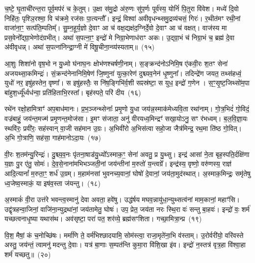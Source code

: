 च॒ष्टे॒ घृ॒ताची॑रन्त॒रा पूर्व॒मप॑रं च के॒तुम्। उ॒क्षा स॑मु॒द्रो अ॑रु॒णः सु॑प॒र्णः पूर्व॑स्य॒ योनिं॑ पि॒तुरा वि॑वेश। मध्ये॑ दि॒वो निहि॑तः॒ पृश्ञि॒रश्मा॒ वि च॑क्रमे॒ रज॑सः पा॒त्यन्तौ᳚। इन्द्रं॒ विश्वा॑ अवीवृधन्थ्समु॒द्रव्य॑चसं॒ गिरः॑। र॒थीत॑मꣳ रथी॒नां वाजा॑ना॒ꣳ॒ सत्प॑ति॒म्पतिम्᳚। सु॒म्न॒हूर्य॒ज्ञो दे॒वाꣳ आ च॑ वक्ष॒द्यक्ष॑द॒ग्निर्दे॒वो दे॒वाꣳ आ च॑ वक्षत्। वाज॑स्य मा प्रस॒वेनो᳚द्ग्रा॒भेणोद॑ग्रभीत्। अथा॑ स॒पत्ना॒ꣳ॒ इन्द्रो॑ मे निग्रा॒भेणाध॑राꣳ अकः। उ॒द्ग्रा॒भं च॑ निग्रा॒भं च॒ ब्रह्म॑ दे॒वा अ॑वीवृधन्न्। अथा॑ स॒पत्ना॑निन्द्रा॒ग्नी मे॑ विषू॒चीना॒न्व्य॑स्यताम्॥~(१५)

{\anuvakamend[{दे॒वाः श॒तप॑या अ॒भि वाज॑स्य॒ षड्विꣳ॑शतिश्च}]}%

आ॒शुः शिशा॑नो वृष॒भो न यु॒ध्मो घ॑नाघ॒नः क्षोभ॑णश्चर्\mbox{}षणी॒नाम्। स॒ङ्क्रन्द॑नो\-ऽनिमि॒ष ए॑कवी॒रः श॒तꣳ सेना॑ अजयथ्सा॒कमिन्द्रः॑। सं॒क्रन्द॑नेनानिमि॒षेण॑ जि॒ष्णुना॑ युत्का॒रेण॑ दुश्च्यव॒नेन॑ धृ॒ष्णुना᳚। तदिन्द्रे॑ण जयत॒ तथ्स॑हध्वं॒ युधो॑ नर॒ इषु॑हस्तेन॒ वृष्णा᳚। स इषु॑हस्तैः॒ स नि॑ष॒ङ्गिभि॑र्व॒शी सꣴस्र॑ष्टा॒ स युध॒ इन्द्रो॑ ग॒णेन। स॒ꣳ॒सृ॒ष्ट॒जिथ्सो॑म॒पा बा॑हुश॒र्ध्यू᳚र्ध्वध॑न्वा॒ प्रति॑हिताभि॒रस्ता᳚। बृह॑स्पते॒ परि॑ दीय~(१६)

रथे॑न रक्षो॒हामित्राꣳ॑ अप॒बाध॑मानः। प्र॒भ॒ञ्जन्थ्सेनाः᳚ प्रमृ॒णो यु॒धा जय॑न्न॒स्माक॑मेध्यवि॒ता रथा॑नाम्। गो॒त्र॒भिदं॑ गो॒विदं॒ वज्र॑बाहुं॒ जय॑न्त॒मज्म॑ प्रमृ॒णन्त॒मोज॑सा। इ॒मꣳ स॑जाता॒ अनु॑ वीरयध्व॒मिन्द्रꣳ॑ सखा॒यो\-ऽनु॒ सꣳ र॑भध्वम्। ब॒ल॒वि॒ज्ञा॒यः स्थवि॑रः॒ प्रवी॑रः॒ सह॑स्वान् वा॒जी सह॑मान उ॒ग्रः। अ॒भिवी॑रो अ॒भिस॑त्वा सहो॒जा जैत्र॑मिन्द्र॒ रथ॒मा ति॑ष्ठ गो॒वित्। अ॒भि गो॒त्राणि॒ सह॑सा॒ गाह॑मानो\-ऽदा॒यः~(१७)

वी॒रः श॒तम॑न्यु॒रिन्द्रः॑। दु॒श्च्य॒व॒नः पृ॑तना॒षाड॑यु॒ध्यो᳚\-ऽस्माक॒ꣳ॒ सेना॑ अवतु॒ प्र यु॒थ्सु। इन्द्र॑ आसां ने॒ता बृह॒स्पति॒र्दक्षि॑णा य॒ज्ञः पु॒र ए॑तु॒ सोमः॑। दे॒व॒से॒नाना॑मभिभञ्जती॒नां जय॑न्तीनां म॒रुतो॑ य॒न्त्वग्रे᳚। इन्द्र॑स्य॒ वृष्णो॒ वरु॑णस्य॒ राज्ञ॑ आदि॒त्यानां᳚ म॒रुता॒ꣳ॒ शर्ध॑ उ॒ग्रम्। म॒हाम॑नसां भुवनच्य॒वानां॒ घोषो॑ दे॒वानां॒ जय॑ता॒मुद॑स्थात्। अ॒स्माक॒मिन्द्रः॒ समृ॑तेषु ध्व॒जेष्व॒स्माकं॒ या इष॑व॒स्ता ज॑यन्तु।~(१८)

अ॒स्माकं॑ वी॒रा उत्त॑रे भवन्त्व॒स्मानु॑ देवा अवता॒ हवे॑षु। उद्ध॑र्\mbox{}षय मघव॒न्नायु॑धा॒न्युथ्सत्व॑नां माम॒कानां॒ महाꣳ॑सि। उद्वृ॑त्रहन्वा॒जिनां॒ वाजि॑ना॒न्युद्रथा॑नां॒ जय॑तामेतु॒ घोषः॑। उप॒ प्रेत॒ जय॑ता नरः स्थि॒रा वः॑ सन्तु बा॒हवः॑। इन्द्रो॑ वः॒ शर्म॑ यच्छत्वनाधृ॒ष्या यथास॑थ। अव॑सृष्टा॒ परा॑ पत॒ शर॑व्ये॒ ब्रह्म॑सꣳशिता। गच्छा॒मित्रा॒न्प्र~(१९)

वि॒श॒ मैषां॒ कं च॒नोच्छि॑षः। मर्मा॑णि ते॒ वर्म॑भिश्छादयामि॒ सोम॑स्त्वा॒ राजा॒मृते॑ना॒भि व॑स्ताम्। उ॒रोर्वरी॑यो॒ वरि॑वस्ते अस्तु॒ जय॑न्तं॒ त्वामनु॑ मदन्तु दे॒वाः। यत्र॑ बा॒णाः स॒म्पत॑न्ति कुमा॒रा वि॑शि॒खा इ॑व। इन्द्रो॑ न॒स्तत्र॑ वृत्र॒हा वि॑श्वा॒हा शर्म॑ यच्छतु॥~(२०)

